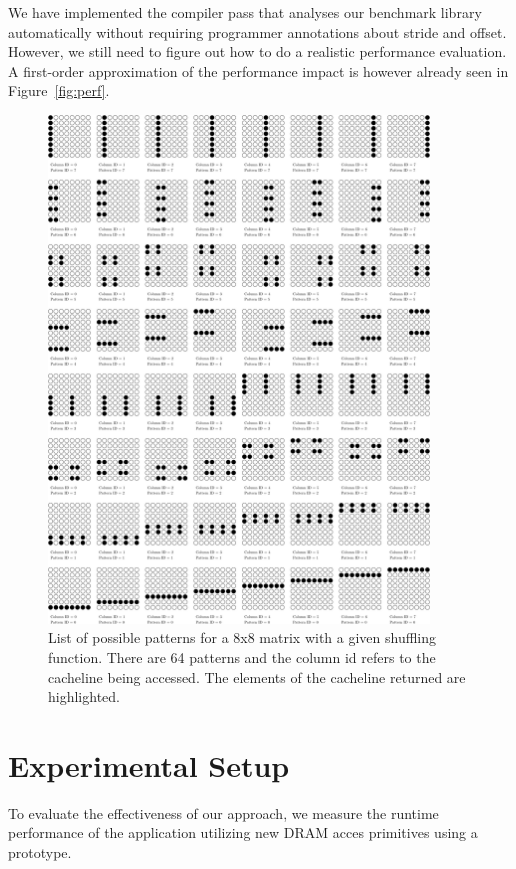 \documentclass[letterpaper]{article}
\begin{document}
We have implemented the compiler pass that analyses our benchmark library automatically without requiring
programmer annotations about stride and offset. However, we still need to figure out how to do
a realistic performance evaluation. A first-order approximation of the performance impact is
however already seen in Figure~\ref{fig:perf}.
\begin{figure}[ht!]
	\centering
	\includegraphics[width=0.9\textwidth]{images/pattern}
	\caption{List of possible patterns for a 8x8 matrix with a given shuffling
	function. There are 64 patterns and the column id refers to the cacheline
	being accessed. The elements of the cacheline returned are highlighted.}
	\label{fig:pattern}
\end{figure}

\section{Experimental Setup}

To evaluate the effectiveness of our approach, we measure the runtime performance of the application utilizing new DRAM acces primitives using a prototype.
\end{document}
